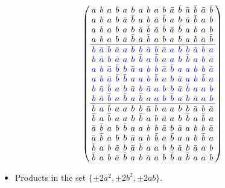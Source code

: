 \documentclass{beamer}
\newcommand{\bblue}[1]{\textcolor{blue}{#1}}
\begin{document}
\begin{frame}

  \[
    \arraycolsep=2.0pt\def\arraystretch{0.75}
    \left(
      \begin{array}{cccccccccccccccc}
        a&b&a&b&a&b&a&b&a&b&\bar{a}&\bar{b}&\bar{a}&\bar{b}&\bar{a}&\bar{b}\\
        a&b&a&b&\bar{a}&\bar{b}&a&b&\bar{a}&\bar{b}&a&b&\bar{a}&\bar{b}&a&b\\
        a&b&a&b&a&b&\bar{a}&\bar{b}&\bar{a}&\bar{b}&\bar{a}&\bar{b}&a&b&a&b\\
        a&b&a&b&\bar{a}&\bar{b}&\bar{a}&\bar{b}&a&b&a&b&a&b&\bar{a}&\bar{b}\\ \hline
\bblue{b}&\bblue{\bar{a}}&\bblue{b}&\bblue{\bar{a}}&\bblue{a}&\bblue{b}&\bblue{b}&\bblue{\bar{a}}&\bblue{b}&\bblue{\bar{a}}&\bblue{a}&\bblue{b}&\bblue{b}&\bblue{\bar{a}}&\bblue{\bar{b}}&\bblue{a}\\
\bblue{b}&\bblue{\bar{a}}&\bblue{b}&\bblue{\bar{a}}&\bblue{a}&\bblue{b}&\bblue{\bar{b}}&\bblue{a}&\bblue{\bar{b}}&\bblue{a}&\bblue{a}&\bblue{b}&\bblue{\bar{b}}&\bblue{a}&\bblue{b}&\bblue{\bar{a}}\\
\bblue{a}&\bblue{b}&\bblue{\bar{a}}&\bblue{\bar{b}}&\bblue{b}&\bblue{\bar{a}}&\bblue{a}&\bblue{b}&\bblue{b}&\bblue{\bar{a}}&\bblue{\bar{b}}&\bblue{a}&\bblue{a}&\bblue{b}&\bblue{b}&\bblue{\bar{a}}\\
\bblue{a}&\bblue{b}&\bblue{\bar{a}}&\bblue{\bar{b}}&\bblue{\bar{b}}&\bblue{a}&\bblue{a}&\bblue{b}&\bblue{\bar{b}}&\bblue{a}&\bblue{b}&\bblue{\bar{a}}&\bblue{a}&\bblue{b}&\bblue{\bar{b}}&\bblue{a}\\
\bblue{b}&\bblue{\bar{a}}&\bblue{\bar{b}}&\bblue{a}&\bblue{b}&\bblue{\bar{a}}&\bblue{b}&\bblue{\bar{a}}&\bblue{a}&\bblue{b}&\bblue{b}&\bblue{\bar{a}}&\bblue{\bar{b}}&\bblue{a}&\bblue{a}&\bblue{b}\\
\bblue{b}&\bblue{\bar{a}}&\bblue{\bar{b}}&\bblue{a}&\bblue{\bar{b}}&\bblue{a}&\bblue{\bar{b}}&\bblue{a}&\bblue{a}&\bblue{b}&\bblue{\bar{b}}&\bblue{a}&\bblue{b}&\bblue{\bar{a}}&\bblue{a}&\bblue{b}\\ \hline
        \bar{b}&a&\bar{b}&a&a&b&b&\bar{a}&\bar{b}&a&a&b&b&\bar{a}&b&\bar{a}\\
        \bar{b}&a&\bar{b}&a&a&b&\bar{b}&a&b&\bar{a}&a&b&\bar{b}&a&\bar{b}&a\\
        \bar{a}&\bar{b}&a&b&\bar{b}&a&a&b&b&\bar{a}&b&\bar{a}&a&b&b&\bar{a}\\
        \bar{a}&\bar{b}&a&b&b&\bar{a}&a&b&\bar{b}&a&\bar{b}&a&a&b&\bar{b}&a\\
        \bar{b}&a&b&\bar{a}&b&\bar{a}&\bar{b}&a&a&b&b&\bar{a}&b&\bar{a}&a&b\\
        \bar{b}&a&b&\bar{a}&\bar{b}&a&b&\bar{a}&a&b&\bar{b}&a&\bar{b}&a&a&b\\
      \end{array}
    \right)
  \]

  \begin{itemize}
    \item Products in the set $\{\pm 2a^2, \pm 2b^2, \pm 2ab\}$.
  \end{itemize}

\end{frame}
\end{document}
